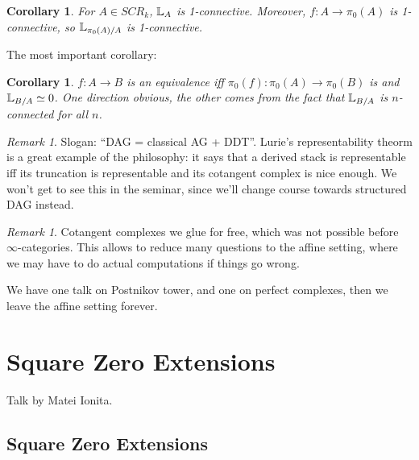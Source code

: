 \documentclass[10pt,a4paper,reqno,oneside]{book} %
\theoremstyle{plain}
\newtheorem{cor}[thm]{Corollary}
\theoremstyle{definition}
\theoremstyle{remark}
\newtheorem{rem}[thm]{Remark}
\numberwithin{equation}{section}
\begin{document}
\begin{cor}
For $A \in SCR_k$, $\mathbb L_A$ is 1-connective. Moreover, $f:A \to \pi_0(A)$ is 1-connective, so $\mathbb L_{\pi_0(A)/A}$ is
1-connective.
\end{cor}

The most important corollary:
\begin{cor}
$f: A \to B$ is an equivalence iff $\pi_0(f) : \pi_0(A) \to \pi_0(B)$ is and $\mathbb L_{B/A} \simeq 0$. One direction obvious, the
other comes from the fact that $\mathbb L_{B/A}$ is $n$-connected for all $n$.
\end{cor}

\begin{rem}
Slogan: ``DAG = classical AG + DDT''.
Lurie's representability theorm is a great example of the philosophy: it says that a derived stack is representable iff
its truncation is representable and its cotangent complex is nice enough. We won't get to see this in the seminar, since we'll
change course towards structured DAG instead.
\end{rem}


\begin{rem}
Cotangent complexes we glue for free, which was not possible before $\infty$-categories. This allows to reduce many questions
to the affine setting, where we may have to do actual computations if things go wrong.
\end{rem}

We have one talk on Postnikov tower, and one on perfect complexes, then we leave the affine setting forever.








\chapter{Square Zero Extensions}
Talk by Matei Ionita.

\section{Square Zero Extensions}
\label{sect:sq0_sq0}
\end{document}
